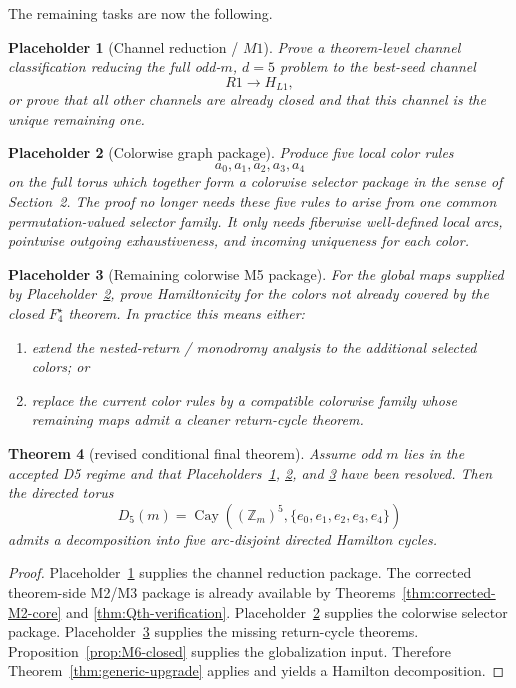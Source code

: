 \documentclass[11pt]{article}
\newtheorem{theorem}{Theorem}[section]
\newtheorem{placeholder}[theorem]{Placeholder}
\newcommand{\Z}{\mathbb Z}
\begin{document}
The remaining tasks are now the following.

\begin{placeholder}[Channel reduction / $M1$]
\label{ph:M1}
Prove a theorem-level channel classification reducing the full odd-$m$, $d=5$
problem to the best-seed channel
\[
R1\to H_{L1},
\]
or prove that all other channels are already closed and that this channel is the
unique remaining one.
\end{placeholder}

\begin{placeholder}[Colorwise graph package]
\label{ph:colorwise-graph}
Produce five local color rules
\[
a_0,a_1,a_2,a_3,a_4
\]
on the full torus which together form a colorwise selector package in the sense
of Section~2.
The proof no longer needs these five rules to arise from one common
permutation-valued selector family.
It only needs fiberwise well-defined local arcs, pointwise outgoing
exhaustiveness, and incoming uniqueness for each color.
\end{placeholder}

\begin{placeholder}[Remaining colorwise M5 package]
\label{ph:remaining-M5}
For the global maps supplied by Placeholder~\ref{ph:colorwise-graph}, prove
Hamiltonicity for the colors not already covered by the closed
$F_4^{\star}$ theorem. In practice this means either:
\begin{enumerate}[label=\textup{(\alph*)},leftmargin=2.5em]
\item extend the nested-return / monodromy analysis to the additional selected
      colors; or
\item replace the current color rules by a compatible colorwise family whose
      remaining maps admit a cleaner return-cycle theorem.
\end{enumerate}
\end{placeholder}

\begin{theorem}[revised conditional final theorem]
\label{thm:revised-conditional-final}
Assume odd $m$ lies in the accepted D5 regime and that
Placeholders~\ref{ph:M1}, \ref{ph:colorwise-graph}, and
\ref{ph:remaining-M5} have been resolved.
Then the directed torus
\[
D_5(m)=\operatorname{Cay}((\Z_m)^5,\{e_0,e_1,e_2,e_3,e_4\})
\]
admits a decomposition into five arc-disjoint directed Hamilton cycles.
\end{theorem}

\begin{proof}
Placeholder~\ref{ph:M1} supplies the channel reduction package.
The corrected theorem-side M2/M3 package is already available by
Theorems~\ref{thm:corrected-M2-core} and \ref{thm:Qth-verification}.
Placeholder~\ref{ph:colorwise-graph} supplies the colorwise selector package.
Placeholder~\ref{ph:remaining-M5} supplies the missing return-cycle theorems.
Proposition~\ref{prop:M6-closed} supplies the globalization input.
Therefore Theorem~\ref{thm:generic-upgrade} applies and yields a Hamilton
decomposition.
\end{proof}
\end{document}
